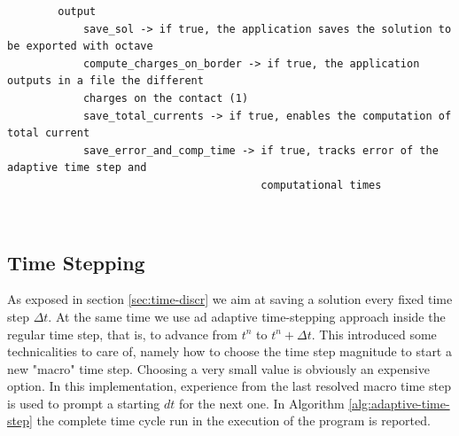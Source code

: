 \documentclass[11pt,a4paper]{article}
\begin{document}
\begin{minipage}{\textwidth}
	\vspace{3mm}
	\small
	\begin{verbatim}
		output
		    save_sol -> if true, the application saves the solution to be exported with octave
		    compute_charges_on_border -> if true, the application outputs in a file the different
		    charges on the contact (1)
		    save_total_currents -> if true, enables the computation of total current
		    save_error_and_comp_time -> if true, tracks error of the adaptive time step and
		                                computational times
	\end{verbatim}
\end{minipage}\\

\subsection{Time Stepping}\label{sec:timecycle}
As exposed in section \ref{sec:time-discr} we aim at saving a solution every fixed time step \(\Delta t\). At the same time we use ad adaptive time-stepping approach inside the regular time step, that is, to advance from \(t^n\) to \(t^n+\Delta t\). This introduced some technicalities to care of, namely how to choose the time step magnitude to start a new "macro" time step. Choosing a very small value is obviously an expensive option. In this implementation, experience from the last resolved macro time step is used to prompt a starting \(dt\) for the next one. In Algorithm \ref{alg:adaptive-time-step} the complete time cycle run in the execution of the program is reported.
\end{document}
